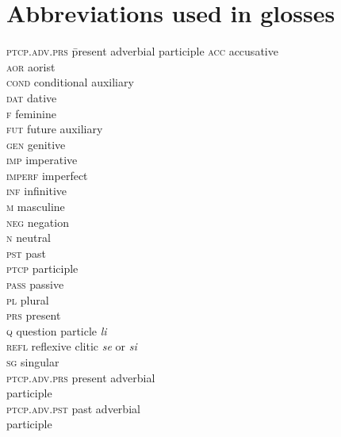 \section*{Abbreviations used in glosses}
\begin{multicols}{2}
\begin{tabbing}
\textsc{ptcp.adv.prs}\hspace{1ex} \= present adverbial participle\kill
\textsc{acc} \>accusative\\
\textsc{aor} \>aorist\\
\textsc{cond} \>conditional auxiliary\\
\textsc{dat} \>dative\\
\textsc{f} \>feminine\\
\textsc{fut} \>future auxiliary\\
\textsc{gen} \>genitive\\
\textsc{imp} \>imperative\\
\textsc{imperf} \>imperfect\\
\textsc{inf} \>infinitive\\
\textsc{m} \>masculine\\
\textsc{neg} \>negation\\
\textsc{n} \>neutral\\
\textsc{pst} \>past\\
\textsc{ptcp} \>participle\\
\textsc{pass} \>passive\\
\textsc{pl} \>plural\\
\textsc{prs} \>present\\
\textsc{q} \>question particle \textit{li}\\
\textsc{refl} \>reflexive clitic \textit{se} or \textit{si}\\
\textsc{sg} \>singular\\
\textsc{ptcp.adv.prs} \>present adverbial \\ \> participle\\
\textsc{ptcp.adv.pst} \>past adverbial \\ \> participle \\
\end{tabbing}
\end{multicols}

